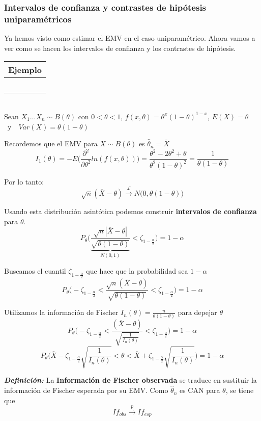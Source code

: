 \subsubsection{Intervalos de confianza y contrastes de hipótesis uniparamétricos}

Ya hemos visto como estimar el EMV en el caso uniparamétrico. Ahora vamos a ver como se hacen los intervalos de confianza y los contrastes de hipótesis.

\hspace{-1cm}\noindent\begin{tabular}{r}
    \textbf{Ejemplo}  \\ \hline \ \\
\end{tabular}\\
Sean $X_1\dots X_n\sim B(\theta)$ con $0<\theta < 1$, $f(x,\theta)=\theta^x(1-\theta)^{1-x}$, $E(X)=\theta$\ y\ \ $Var(X)=\theta(1-\theta)$

Recordemos que el EMV para $X\sim B(\theta)$ es $\hat\theta_n=\overline{X}$
$$I_1(\theta)=-E\Big(\frac{\partial^2}{\partial\theta^2}ln(f(x,\theta))\Big)=\frac{\theta^2-2\theta^2+\theta}{\theta^2(1-\theta)^2}=\frac{1}{\theta(1-\theta)}$$

Por lo tanto: 
$$\sqrt{n}(\overline{X}-\theta)\overset{\mathcal{L}}{\longrightarrow}N\big(0,\theta(1-\theta)\big)$$

Usando esta distribución asintótica podemos construir \textbf{intervalos de confianza} para $\theta$.
$$P_\theta\Bigg(\underbrace{\frac{\sqrt{n}|\overline{X}-\theta|}{\sqrt{\theta(1-\theta)}}}_{N(0,1)}<\zeta_{1-\frac{\alpha}{2}}\Bigg)=1-\alpha$$

Buscamos el cuantil $\zeta_{1-\frac{\alpha}{2}}$ que hace que la probabilidad sea $1-\alpha$
$$P_\theta\Bigg(-\zeta_{1-\frac{\alpha}{2}}<\frac{\sqrt{n}(\overline{X}-\theta)}{\sqrt{\theta(1-\theta)}}<\zeta_{1-\frac{\alpha}{2}}\Bigg)=1-\alpha$$

Utilizamos la información de Fischer $I_n(\theta)=\frac{n}{\theta(1-\theta)}$ para depejar $\theta$
$$P_\theta\Bigg(-\zeta_{1-\frac{\alpha}{2}}<\frac{(\overline{X}-\theta)}{\sqrt{\frac{1}{I_n(\theta)}}}<\zeta_{1-\frac{\alpha}{2}}\Bigg)=1-\alpha$$
$$P_\theta\Bigg(\overline{X}-\zeta_{1-\frac{\alpha}{2}}\sqrt{\frac{1}{I_n(\theta)}}<\theta<\overline{X}+\zeta_{1-\frac{\alpha}{2}}\sqrt{\frac{1}{I_n(\theta)}}\Bigg)=1-\alpha$$

    \textit{\textbf{Definición:}} La \textbf{Información de Fischer observada }se traduce en sustituir la información de Fischer esperada por su EMV. Como $\hat\theta_n$ es CAN para $\theta$, se tiene que
    $$If_{obs}\overset{p}{\longrightarrow}If_{esp}$$

